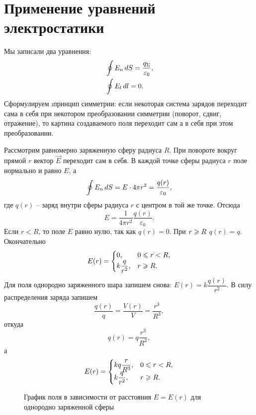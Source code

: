\section{Применение уравнений электростатики}

	Мы записали два уравнения:
	\begin{eqnarray}
		& \oint E_n \,d S=\dfrac{q_{\Sigma}}{\varepsilon_0}, \\
		& \oint E_l \,d l=0.
	\end{eqnarray}
	Сформулируем \i{принцип симметрии}: если некоторая система зарядов переходит сама в себя при некотором преобразовании симметрии (поворот, сдвиг, отражение), то картина создаваемого поля переходит сам а в себя при этом преобразовании. \par

	Рассмотрим равномерно заряженную сферу  радиуса $R$. При повороте вокруг прямой $r$ вектор $\vec{E}$ переходит сам в себя. В каждой точке сферы радиуса $r$ поле  нормально и равно $E$, а 
	\begin{equation}
		\oint E_n \,d S=E\cdot 4\pi r^2=\frac{q(r)}{\varepsilon_0},
	\end{equation}
	где $q(r)$ -- заряд внутри сферы радиуса $r$ с центром в той же точке. Отсюда
	\begin{equation}
		E=\frac{1}{4\pi r^2}\frac{q(r)}{\varepsilon_0}.
	\end{equation}
	Если $r<R$, то поле $E$ равно нулю, так как $q(r)=0$. При $r\geqslant R$ $q(r)=q$. Окончательно
	\begin{equation}
		E(r)=	\begin{cases}
					0,& \text{$0\leqslant r<R$},\\
					k\dfrac{q}{r^2},& \text{$r\geqslant R$}.
				\end{cases}
	\end{equation}
	Для поля однородно заряженного шара запишем снова: $E(r)=k\dfrac{q(r)}{r^2}$. В силу распределения заряда запишем
		$$\dfrac{q(r)}{q}=\frac{V(r)}{V}=\frac{r^3}{R^3},$$
	откуда
		$$q(r)=q\frac{r^3}{R^3},$$
	а
	\begin{equation}
		E(r)=	\begin{cases}
					kq\dfrac{r}{R^3},& \text{$0\leqslant r<R$},\\
					k\dfrac{q}{r^2},& \text{$r\geqslant R$}.
				\end{cases}
	\end{equation}
	\begin{figure}[t]
		\centering
		
		\caption{График поля в зависимости от расстояния $E=E(r)$ для однородно заряженной сферы}
	\end{figure}
